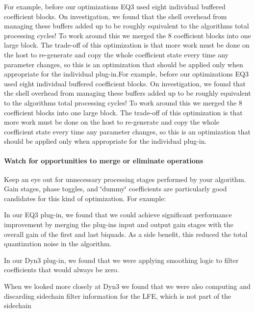 For example, before our optimizations E\+Q3 used eight individual buffered coefficient blocks. On investigation, we found that the shell overhead from managing these buffers added up to be roughly equivalent to the algorithm\textquotesingle{}s total processing cycles! To work around this we merged the 8 coefficient blocks into one large block. The trade-\/off of this optimization is that more work must be done on the host to re-\/generate and copy the whole coefficient state every time any parameter changes, so this is an optimization that should be applied only when appropriate for the individual plug-\/in.\+For example, before our optimizations E\+Q3 used eight individual buffered coefficient blocks. On investigation, we found that the shell overhead from managing these buffers added up to be roughly equivalent to the algorithm\textquotesingle{}s total processing cycles! To work around this we merged the 8 coefficient blocks into one large block. The trade-\/off of this optimization is that more work must be done on the host to re-\/generate and copy the whole coefficient state every time any parameter changes, so this is an optimization that should be applied only when appropriate for the individual plug-\/in.

\hypertarget{a00362_subsubsection__watch_for_opportunities_to_merge_or_eliminate_operations_}{}\paragraph{Watch for opportunities to merge or eliminate operations}\label{a00362_subsubsection__watch_for_opportunities_to_merge_or_eliminate_operations_}
 Keep an eye out for unnecessary processing stages performed by your algorithm. Gain stages, phase toggles, and \char`\"{}dummy\char`\"{} coefficients are particularly good candidates for this kind of optimization. For example\+:


\begin{DoxyItemize}
\item In our E\+Q3 plug-\/in, we found that we could achieve significant performance improvement by merging the plug-\/in\textquotesingle{}s input and output gain stages with the overall gain of the first and last biquads. As a side benefit, this reduced the total quantization noise in the algorithm.  
\item In our Dyn3 plug-\/in, we found that we were applying smoothing logic to filter coefficients that would always be zero.  
\item When we looked more closely at Dyn3 we found that we were also computing and discarding sidechain filter information for the L\+F\+E, which is not part of the sidechain  
\end{DoxyItemize}

